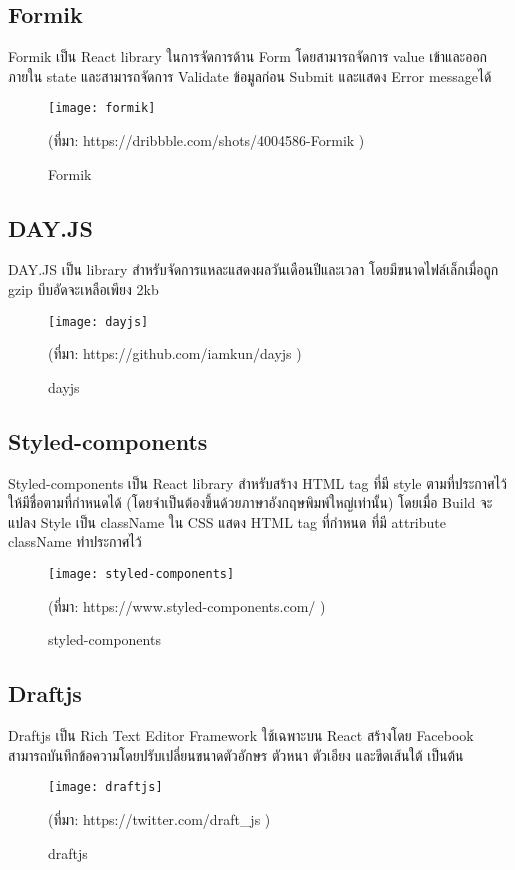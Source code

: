 \subsection{Formik}
Formik เป็น React library ในการจัดการด้าน Form โดยสามารถจัดการ value เข้าและออก ภายใน state และสามารถจัดการ Validate ข้อมูลก่อน Submit และแสดง Error messageได้

\begin{figure}[!h]
	\centering
	\texttt{[image: formik]}
	\caption{Formik}
	(ที่มา: 
	https://dribbble.com/shots/4004586-Formik
	)
	\label{Fig:formik}
\end{figure}


\subsection{DAY.JS}
DAY.JS เป็น library สำหรับจัดการแหละแสดงผลวันเดือนปีและเวลา โดยมีขนาดไฟล์เล็กเมื่อถูก gzip บีบอัดจะเหลือเพียง 2kb
\begin{figure}[!h]
	\centering
	\texttt{[image: dayjs]}
	\caption{dayjs}
	(ที่มา: 
	https://github.com/iamkun/dayjs
	)
	\label{Fig:dayjs}
\end{figure}

\subsection{Styled-components}
Styled-components เป็น React library สำหรับสร้าง HTML tag ที่มี style ตามที่ประกาศไว้ ให้มีชื่อตามที่กำหนดได้ 
(โดยจำเป็นต้องขึ้นด้วยภาษาอังกฤษพิมพ์ใหญ่เท่านั้น) โดยเมื่อ Build จะแปลง Style เป็น className ใน CSS 
แสดง HTML tag ที่กำหนด ที่มี attribute className ทำประกาศไว้  
\begin{figure}[!h]
	\centering
	\texttt{[image: styled-components]}
	\caption{styled-components}
	(ที่มา: 
	https://www.styled-components.com/
	)
	\label{Fig:styled-components}
\end{figure}



\subsection{Draftjs}
Draftjs เป็น Rich Text Editor Framework ใช้เฉพาะบน React สร้างโดย Facebook 
สามารถบันทึกข้อความโดยปรับเปลี่ยนขนาดตัวอักษร ตัวหนา ตัวเอียง และขีดเส้นใต้ เป็นต้น 
\begin{figure}[!h]
	\centering
	\texttt{[image: draftjs]}
	\caption{draftjs}
	(ที่มา: 
	https://twitter.com/draft\_js
	)
	\label{Fig:draftjs}
\end{figure}
